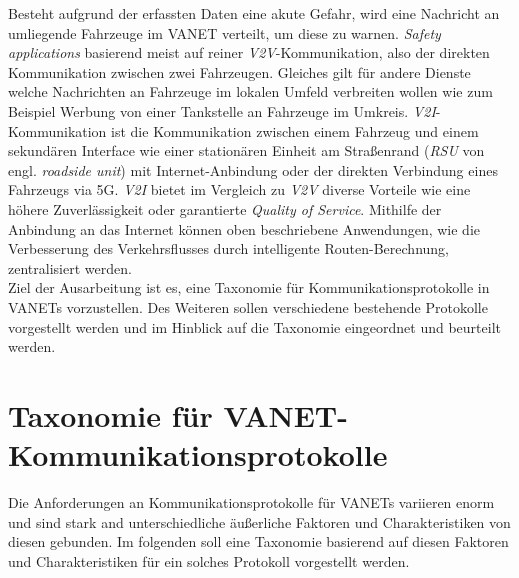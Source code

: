 \documentclass[english,runningheads,a4paper]{llncs}[2018/03/10]
\begin{document}
Besteht aufgrund der erfassten Daten eine akute Gefahr, wird eine Nachricht an umliegende Fahrzeuge im VANET verteilt, um diese zu warnen.
\textit{Safety applications} basierend meist auf reiner \textit{V2V}-Kommunikation, also der direkten Kommunikation zwischen zwei Fahrzeugen.
Gleiches gilt für andere Dienste welche Nachrichten an Fahrzeuge im lokalen Umfeld verbreiten wollen wie zum Beispiel Werbung von einer Tankstelle an Fahrzeuge im Umkreis.
\textit{V2I}-Kommunikation ist die Kommunikation zwischen einem Fahrzeug und einem sekundären Interface wie einer stationären Einheit am Straßenrand (\textit{RSU} von engl. \textit{roadside unit}) mit Internet-Anbindung oder der direkten Verbindung eines Fahrzeugs via 5G\@.
\textit{V2I} bietet im Vergleich zu \textit{V2V} diverse Vorteile wie eine höhere Zuverlässigkeit oder garantierte \textit{Quality of Service}.
Mithilfe der Anbindung an das Internet können oben beschriebene Anwendungen, wie die Verbesserung des Verkehrsflusses durch intelligente Routen-Berechnung, zentralisiert werden.\\
Ziel der Ausarbeitung ist es, eine Taxonomie für Kommunikationsprotokolle in VANETs vorzustellen.
Des Weiteren sollen verschiedene bestehende Protokolle vorgestellt werden und im Hinblick auf die Taxonomie eingeordnet und beurteilt werden.


\section{Taxonomie für VANET-Kommunikationsprotokolle}
\label{sec:taxcommunicationprotocol}
Die Anforderungen an Kommunikationsprotokolle für VANETs variieren enorm und sind stark and unterschiedliche äußerliche Faktoren und Charakteristiken von diesen gebunden.
Im folgenden soll eine Taxonomie basierend auf diesen Faktoren und Charakteristiken für ein solches Protokoll vorgestellt werden.
\end{document}
